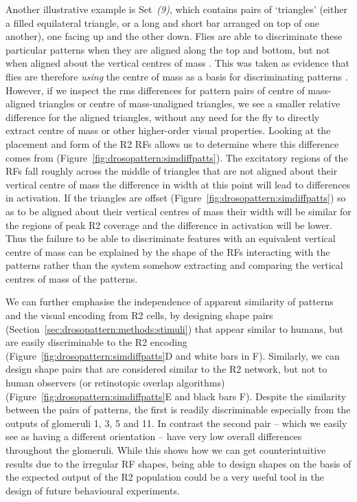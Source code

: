 Another illustrative example is Set~\emph{(9)}, which contains pairs of `triangles' (either a filled equilateral triangle, or a long and short bar arranged on top of one another), one facing up and the other down.
Flies are able to discriminate these particular patterns when they are aligned along the top and bottom, but not when aligned about the vertical centres of mass \cite{Ernst1999}.
This was taken as evidence that flies are therefore \emph{using} the centre of mass as a basis for discriminating patterns \cite{Ernst1999}.
However, if we inspect the \ac{rms} differences for pattern pairs of centre of mass-aligned triangles or centre of mass-unaligned triangles, we see a smaller relative difference for the aligned triangles, without any need for the fly to directly extract centre of mass or other higher-order visual properties.
Looking at the placement and form of the R2 RFs allows us to determine where this difference comes from (Figure~\ref{fig:drosopattern:simdiffpatts}).
The excitatory regions of the RFs fall roughly across the middle of triangles that are not aligned about their vertical centre of mass the difference in width at this point will lead to differences in activation. If the triangles are offset (Figure~\ref{fig:drosopattern:simdiffpatts}) so as to be aligned about their vertical centres of mass their width will be similar for the regions of peak R2 coverage and the difference in activation will be lower.
Thus the failure to be able to discriminate features with an equivalent vertical centre of mass can be explained by the shape of the RFs interacting with the patterns rather than the system somehow extracting and comparing the vertical centres of mass of the patterns.



We can further emphasise the independence of apparent similarity of patterns and the visual encoding from R2 cells, by designing shape pairs (Section~\ref{sec:drosopattern:methods:stimuli}) that appear similar to humans, but are easily discriminable to the R2 encoding (Figure~\ref{fig:drosopattern:simdiffpatts}D and white bars in F). Similarly, we can design shape pairs that are considered similar to the R2 network, but not to human observers (or retinotopic overlap algorithms) (Figure~\ref{fig:drosopattern:simdiffpatts}E and black bars F). Despite the similarity between the pairs of patterns, the first is readily discriminable especially from the outputs of glomeruli 1, 3, 5 and 11. In contrast the second pair -- which we easily see as having a different orientation -- have very low overall differences throughout the glomeruli. While this shows how we can get counterintuitive results due to the irregular RF shapes, being able to design shapes on the basis of the expected output of the R2 population could be a very useful tool in the design of future behavioural experiments.

